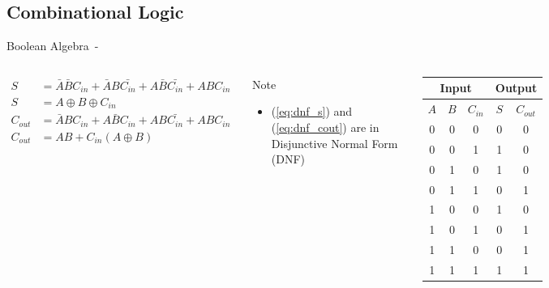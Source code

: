 \subsection{Combinational Logic}
\begin{frame}{Boolean Algebra}{\insertsection ~- \insertsubsection}
    \begin{columns}
        \begin{align}
            S &= \bar{A} \bar{B} {C_{in}} + \bar{A} {B} \bar{C_{in}} + {A} \bar{B} \bar{C_{in}} + {A} {B} {C_{in}} \label{eq:dnf_s}\\
            S &= A \oplus B \oplus {C_{in}} \\
            C_{out} &= \bar{A} {B} {C_{in}} + {A} \bar{B} {C_{in}} + A B \bar{C_{in}} + A B {C_{in}} \label{eq:dnf_cout}\\
            C_{out} &= A B + {C_{in}} ( A \oplus B)
        \end{align}

        \begin{boite1}{Note}
            \begin{itemize}
                \item (\ref{eq:dnf_s}) and (\ref{eq:dnf_cout}) are in Disjunctive Normal Form (DNF)
            \end{itemize}
        \end{boite1}

        \begin{table}[]
        \begin{tabular}{|ccc|cc|}
        \hline
        \multicolumn{3}{|c|}{Input}                              & \multicolumn{2}{c|}{Output}     \\ \hline
        \multicolumn{1}{|c|}{$A$} & \multicolumn{1}{c|}{$B$} & $C_{in}$ & \multicolumn{1}{c|}{$S$} & $C_{out}$ \\ \hline \hline
        0                       & 0                      & 0     & 0                      & 0      \\
        0                       & 0                      & 1     & 1                      & 0      \\
        0                       & 1                      & 0     & 1                      & 0      \\
        0                       & 1                      & 1     & 0                      & 1      \\
        1                       & 0                      & 0     & 1                      & 0      \\
        1                       & 0                      & 1     & 0                      & 1      \\
        1                       & 1                      & 0     & 0                      & 1      \\
        1                       & 1                      & 1     & 1                      & 1      \\ \hline
        \end{tabular}
        \end{table}
    \end{columns}
\end{frame}
